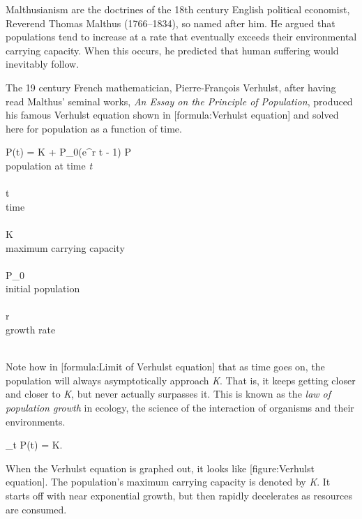 Malthusianism are the doctrines of the 18th century English political economist, Reverend Thomas Malthus (1766--1834), so named after him. He argued that populations tend to increase at a rate that eventually exceeds their environmental carrying capacity. When this occurs, he predicted that human suffering would inevitably follow.\footnotecite[malthus1798]

The 19 century French mathematician, Pierre-François Verhulst, after having read Malthus' seminal works, {\it An Essay on the Principle of Population}, produced his famous Verhulst equation shown in [formula:Verhulst equation] and solved here for population as a function of time.
\crlf

\startformula
P(t) = 
             {K + P_0(e^{r t} - 1)}
\stopformula
\startlegend
\leg P \\ population at time {\it t} \\ \\
\leg t \\ time \\ \\
\leg K \\ maximum carrying capacity \\ \\
\leg P_0 \\ initial population \\ \\
\leg r \\ growth rate \\ \\
\stoplegend
\crlf

Note how in [formula:Limit of Verhulst equation] that as time goes on, the population will always asymptotically approach {\it K}. That is, it keeps getting closer and closer to {\it K}, but never actually surpasses it. This is known as the {\it law of population growth} in ecology, the science of the interaction of organisms and their environments.
\crlf

\startformula
\lim_{t\to\infty} P(t) = K.
\stopformula
\crlf

When the Verhulst equation is graphed out, it looks like [figure:Verhulst equation]. The population's maximum carrying capacity is denoted by {\it K}. It starts off with near exponential growth, but then rapidly decelerates as resources are consumed.

